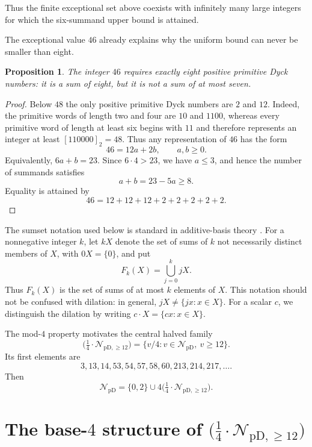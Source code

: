 \documentclass[12pt]{article}
\theoremstyle{plain}
\newtheorem{proposition}[theorem]{Proposition}
\theoremstyle{definition}
\theoremstyle{plain}
\newcommand{\NpD}{\mathcal{N}_{\mathrm{pD}}}
\newcommand{\Pset}{%
  \bigl(\tfrac{1}{4}\cdot\mathcal{N}_{\mathrm{pD},\geq 12}\bigr)%
}
\begin{document}
Thus the finite exceptional set above coexists with infinitely many large
integers for which the six-summand upper bound is attained.

The exceptional value $46$ already explains why the uniform bound can
never be smaller than eight.

\begin{proposition}\label{prop:46}
The integer $46$ requires exactly eight positive primitive Dyck numbers:
it is a sum of eight, but it is not a sum of at most seven.
\end{proposition}

\begin{proof}
Below $48$ the only positive primitive Dyck numbers are $2$ and $12$.
Indeed, the primitive words of length two and four are $10$ and $1100$,
whereas every primitive word of length at least six begins with $11$ and
therefore represents an integer at least $[110000]_2=48$.  Thus any
representation of $46$ has the form
\[
        46=12a+2b,\qquad a,b\geq0.
\]
Equivalently, $6a+b=23$.  Since $6\cdot4>23$, we have $a\leq3$, and
hence the number of summands satisfies
\[
        a+b=23-5a\geq8.
\]
Equality is attained by
\[
        46=12+12+12+2+2+2+2+2.
\]
\end{proof}


The sumset notation used below is standard in additive-basis theory
\cite[Chap.\ 1]{Nathanson}.  For a nonnegative integer $k$, let $kX$ denote the
set of sums of $k$ not necessarily distinct members of $X$, with
$0X=\{0\}$, and put
\[
 F_k(X)=\bigcup_{j=0}^{k}jX.
\]
Thus $F_k(X)$ is the set of sums of at most $k$ elements of $X$.  This
notation should not be confused with dilation: in general,
$jX\neq\{jx:x\in X\}$.  For a scalar $c$, we distinguish the dilation by
writing $c\cdot X=\{cx:x\in X\}$.

The mod-$4$ property motivates the central halved family
\begin{equation}\label{eq:P-def}
 \Pset=\{v/4:v\in\NpD,\ v\geq12\}.
\end{equation}
Its first elements are
\[
 3,13,14,53,54,57,58,60,213,214,217,\ldots.
\]
Then
\begin{equation}\label{eq:NpD-decomp}
 \NpD=\{0,2\}\cup4\Pset.
\end{equation}


\section{The base-\texorpdfstring{$4$}{4} structure of
\texorpdfstring{$\Pset$}{P}}\label{sec:base4}
\end{document}
